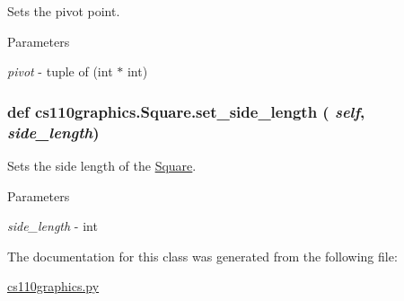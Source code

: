 Sets the pivot point. 
\begin{DoxyParams}{Parameters}
\item[{\em pivot}]-\/ tuple of (int $\ast$ int) \end{DoxyParams}
\hypertarget{classcs110graphics_1_1Square_a4b650f9ef28d4fab88d36ce65e8e0cf1}{
\subsubsection[{set\_\-side\_\-length}]{\setlength{\rightskip}{0pt plus 5cm}def cs110graphics.Square.set\_\-side\_\-length ( {\em self}, \/   {\em side\_\-length})}}
\label{classcs110graphics_1_1Square_a4b650f9ef28d4fab88d36ce65e8e0cf1}


Sets the side length of the \hyperlink{classcs110graphics_1_1Square}{Square}. 
\begin{DoxyParams}{Parameters}
\item[{\em side\_\-length}]-\/ int \end{DoxyParams}


The documentation for this class was generated from the following file:\begin{DoxyCompactItemize}
\item 
\hyperlink{cs110graphics_8py}{cs110graphics.py}\end{DoxyCompactItemize}
